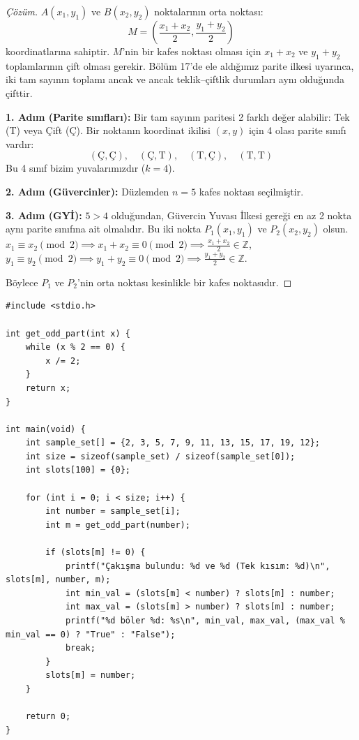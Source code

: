\begin{proof}[Çözüm]
$A(x_1, y_1)$ ve $B(x_2, y_2)$ noktalarının orta noktası:
\[
M = \left( \frac{x_1 + x_2}{2}, \frac{y_1 + y_2}{2} \right)
\]
koordinatlarına sahiptir. $M$'nin bir kafes noktası olması için $x_1 + x_2$ ve $y_1 + y_2$ toplamlarının çift olması gerekir. Bölüm 17'de ele aldığımız parite ilkesi uyarınca, iki tam sayının toplamı ancak ve ancak teklik--çiftlik durumları aynı olduğunda çifttir.

\textbf{1. Adım (Parite sınıfları):}
Bir tam sayının paritesi 2 farklı değer alabilir: Tek (T) veya Çift (Ç).
Bir noktanın koordinat ikilisi $(x, y)$ için 4 olası parite sınıfı vardır:
\[
(\text{Ç}, \text{Ç}), \quad (\text{Ç}, \text{T}), \quad (\text{T}, \text{Ç}), \quad (\text{T}, \text{T})
\]
Bu 4 sınıf bizim yuvalarımızdır ($k = 4$).

\textbf{2. Adım (Güvercinler):}
Düzlemden $n = 5$ kafes noktası seçilmiştir.

\textbf{3. Adım (GYİ):}
$5 > 4$ olduğundan, Güvercin Yuvası İlkesi gereği en az 2 nokta aynı parite sınıfına ait olmalıdır.
Bu iki nokta $P_1(x_1, y_1)$ ve $P_2(x_2, y_2)$ olsun.
$x_1 \equiv x_2 \pmod 2 \implies x_1 + x_2 \equiv 0 \pmod 2 \implies \frac{x_1 + x_2}{2} \in \mathbb{Z}$,
$y_1 \equiv y_2 \pmod 2 \implies y_1 + y_2 \equiv 0 \pmod 2 \implies \frac{y_1 + y_2}{2} \in \mathbb{Z}$.

Böylece $P_1$ ve $P_2$'nin orta noktası kesinlikle bir kafes noktasıdır.
\end{proof}

\begin{lstlisting}[language=CTemel]
#include <stdio.h>

int get_odd_part(int x) {
    while (x % 2 == 0) {
        x /= 2;
    }
    return x;
}

int main(void) {
    int sample_set[] = {2, 3, 5, 7, 9, 11, 13, 15, 17, 19, 12};
    int size = sizeof(sample_set) / sizeof(sample_set[0]);
    int slots[100] = {0};

    for (int i = 0; i < size; i++) {
        int number = sample_set[i];
        int m = get_odd_part(number);

        if (slots[m] != 0) {
            printf("Çakışma bulundu: %d ve %d (Tek kısım: %d)\n", slots[m], number, m);
            int min_val = (slots[m] < number) ? slots[m] : number;
            int max_val = (slots[m] > number) ? slots[m] : number;
            printf("%d böler %d: %s\n", min_val, max_val, (max_val % min_val == 0) ? "True" : "False");
            break;
        }
        slots[m] = number;
    }

    return 0;
}\end{lstlisting}

